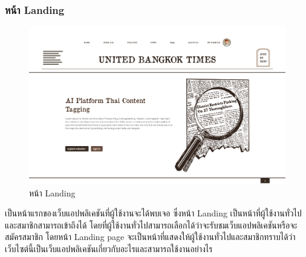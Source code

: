 \documentclass[12pt,oneside,openright,a4paper]{cpe-thai-project}
\begin{document}
\subsubsection{หน้า Landing}
  \begin{figure}[!ht]\centering
    \includegraphics[width=15cm]{./img/project_ui/landing_page1.png} 
    \caption{หน้า Landing}\label{fig:landing_page_1} 
  \end{figure}
  \hspace*{1cm}เป็นหน้าแรกของเว็บแอปพลิเคชันที่ผู้ใช้งานจะได้พบเจอ 
  ซึ่งหน้า Landing เป็นหน้าที่ผู้ใช้งานทั่วไปและสมาชิกสามารถเข้าถึงได้ โดยที่ผู้ใช้งานทั่วไปสามารถเลือกได้ว่าจะรับชมเว็บแอปพลิเคชันหรือจะสมัครสมาชิก 
  โดยหน้า Landing page จะเป็นหน้าที่แสดงให้ผู้ใช้งานทั่วไปและสมาชิกทราบได้ว่าเว็บไซต์นี้เป็นเว็บแอปพลิเคชันเกี่ยวกับอะไรและสามารถใช้งานอย่างไร
\end{document}
